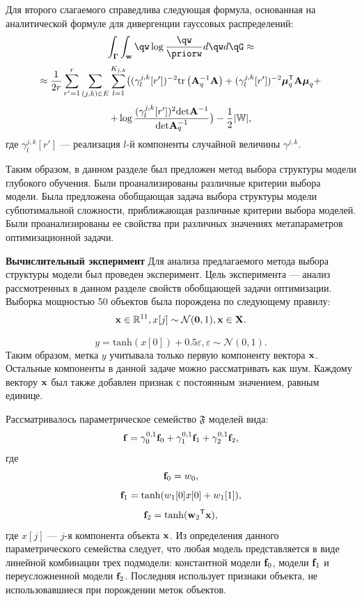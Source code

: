 Для второго слагаемого справедлива следующая формула, основанная на аналитической формуле для дивергенции гауссовых распределений:
\[
    \int_{\G}\int_{\w}\qw\log\frac{\qw}{\priorw}d\qw d\qG \approx
\]
\[
\approx \frac{1}{2r}\sum_{r'=1}^r \sum_{(j,k) \in E} \sum_{l=1}^{K_{j,k}} \bigl( (\gamma^{j,k}_{l}[r'])^{-2}\text{tr}\left(\mathbf{A}_q^{-1}\mathbf{A}\right) + (\gamma^{j,k}_l[r'])^{-2} \boldsymbol{\mu}_q^{\mathsf{T}}\mathbf{A}\boldsymbol{\mu}_q +
\]
\[
+ \log \frac{(\gamma^{j,k}_l[r'])^{2}\text{det}\mathbf{A}^{-1}}{\text{det}\mathbf{A}_q^{-1}}  \bigr) - \frac{1}{2}|\mathbb{W}|,
\]
где $\gamma^{j,k}_l[r']$ --- реализация $l$-й компоненты случайной величины $\gamma^{j,k}$.

Таким образом, в данном разделе был предложен метод выбора структуры модели глубокого обучения. Были проанализированы  различные критерии выбора модели. Была предложена обобщающая задача выбора структуры модели субпотимальной сложности, приближающая различные критерии выбора моделей. Были проанализированы ее свойства при различных значениях метапараметров оптимизационной задачи. 

\textbf{Вычислительный эксперимент}
Для анализа предлагаемого метода выбора структуры модели был проведен эксперимент. Цель эксперимента --- анализ рассмотренных в данном разделе свойств обобщающей задачи оптимизации.
Выборка мощностью 50 объектов была порождена по следующему правилу:
\[
    \mathbf{x} \in \mathbb{R}^{11}, x[j] \sim \mathcal{N}(\mathbf{0},1), \mathbf{x} \in \mathbf{X}.
\]


\[
    y = \text{tanh}(x[0]) + 0.5\varepsilon, \varepsilon \sim \mathcal{N}(0,1).
\]
Таким образом, метка $y$ учитывала только первую компоненту вектора $\mathbf{x}$. Остальные компоненты в данной задаче можно рассматривать как шум. Каждому вектору $\mathbf{x}$ был также добавлен признак с постоянным значением, равным единице. 

Рассматривалось параметрическое семейство $\mathfrak{F}$ моделей вида:
\[
    \mathbf{f}  = \gamma_0^{0,1}\mathbf{f}_0 + \gamma_1^{0,1}\mathbf{f}_1 + \gamma_2^{0,1}\mathbf{f}_2,
\]
где
\[
    \mathbf{f}_0 = w_0,
\]
\[
    \mathbf{f}_1 = \text{tanh}(w_1[0] x[0] + w_1[1] ),
\]
\[
    \mathbf{f}_2 = \text{tanh}({\mathbf{w}_2}^{\mathsf{T}}\mathbf{x}),
\]
где $x[j]$ --- $j$-я компонента объекта $\mathbf{x}$.
Из определения данного параметрического семейства следует, что любая модель представляется в виде линейной комбинации трех подмодели: константной модели $\mathbf{f}_0$, модели $\mathbf{f}_1$ и переусложненной модели $\mathbf{f}_2$. Последняя использует признаки объекта, не использовавшиеся при порождении меток объектов.

